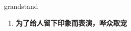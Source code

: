 
\begin{frame}
{\huge grandstand}
\begin{center}
\begin{enumerate}\Large
  \item \textbf{为了给人留下印象而表演，哗众取宠}
\end{enumerate}
\end{center}
\end{frame}
